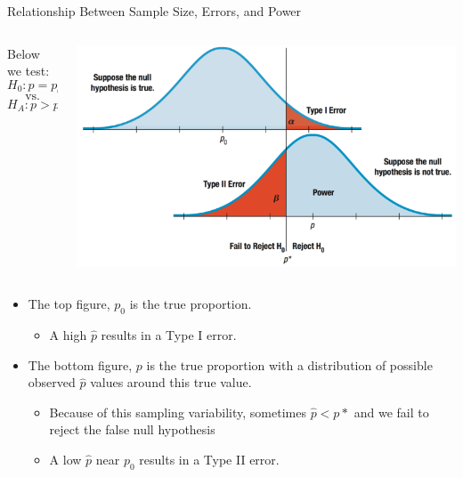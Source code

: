 \documentclass[
  ignorenonframetext,
]{beamer}
\providecommand{\tightlist}{%
  \setlength{\itemsep}{0pt}\setlength{\parskip}{0pt}}
\begin{document}
\begin{frame}{Relationship Between Sample Size, Errors, and Power}
\protect\hypertarget{relationship-between-sample-size-errors-and-power}{}
\begin{columns}
\begin{column}{0.3\textwidth}
Below we test: 
$$H_0:p=p_0 $$
$$ \text{vs.} $$
$$H_A:p>p_o $$
\end{column}
\begin{column}{0.5\textwidth}


\begin{center}\includegraphics[width=1\linewidth]{week13_2} \end{center}

\end{column}
\end{columns}

\begin{itemize}
\item
  The top figure, \(p_0\) is the true proportion.

  \begin{itemize}
  \tightlist
  \item
    A high \(\hat{p}\) results in a Type I error.
  \end{itemize}
\item
  The bottom figure, \(p\) is the true proportion with a distribution of
  possible observed \(\hat{p}\) values around this true value.

  \begin{itemize}
  \item
    Because of this sampling variability, sometimes \(\hat{p} < p*\) and
    we fail to reject the false null hypothesis
  \item
    A low \(\hat{p}\) near \(p_0\) results in a Type II error.
  \end{itemize}
\end{itemize}
\end{frame}
\end{document}
